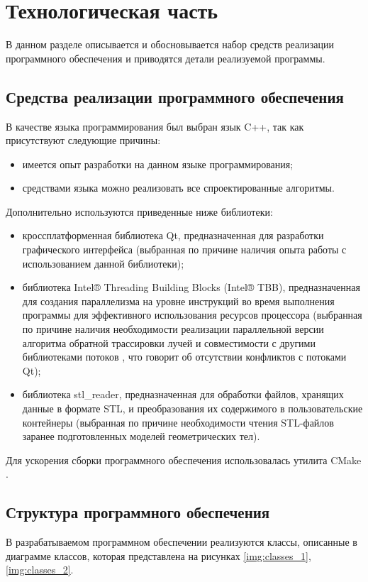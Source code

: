 \chapter{Технологическая часть}

В данном разделе описывается и обосновывается набор средств реализации программного обеспечения и приводятся детали реализуемой программы.

\section{Средства реализации программного обеспечения}

В качестве языка программирования был выбран язык C++, так как присутствуют следующие причины:

\begin{itemize}
	\item имеется опыт разработки на данном языке программирования;
	\item средствами языка можно реализовать все спроектированные алгоритмы.
\end{itemize}

Дополнительно используются приведенные ниже библиотеки:

\begin{itemize}
	\item кроссплатформенная библиотека Qt, предназначенная для разработки графического интерфейса (выбранная по причине наличия опыта работы с использованием данной библиотеки);
	\item библиотека Intel® Threading Building Blocks (Intel® TBB), предназначенная для создания параллелизма на уровне инструкций во время выполнения программы для эффективного использования ресурсов процессора \cite{inteltbb} (выбранная по причине наличия необходимости реализации параллельной версии алгоритма обратной трассировки лучей и совместимости с другими библиотеками потоков \cite{inteltbb}, что говорит об отсутствии конфликтов с потоками Qt);
	\item библиотека stl\_reader, предназначенная для обработки файлов, хранящих данные в формате STL, и преобразования их содержимого в пользовательские контейнеры \cite{stlreader} (выбранная по причине необходимости чтения STL-файлов заранее подготовленных моделей геометрических тел).
\end{itemize}

Для ускорения сборки программного обеспечения использовалась утилита CMake \cite{cmake}.

\section{Структура программного обеспечения}

В разрабатываемом программном обеспечении реализуются классы, описанные в диаграмме классов, которая представлена на рисунках \ref{img:classes_1}, \ref{img:classes_2}.